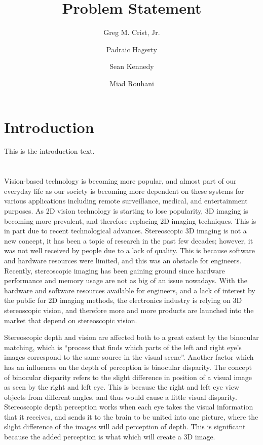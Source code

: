 \documentclass{article}
\title{Problem Statement}
\author{
    Greg M. Crist, Jr.
    \and
    Padraic Hagerty
    \and
    Sean Kennedy
    \and
    Miad Rouhani
}
\begin{document}
\maketitle

\section{Introduction}
This is the introduction text. \cite{segal}

\section{}

Vision-based technology is becoming more popular, and almost part of our everyday life as our society is becoming more dependent on these systems for various applications including remote surveillance, medical, and entertainment purposes. As 2D vision technology is starting to lose popularity, 3D imaging is becoming more prevalent, and therefore replacing 2D imaging techniques. This is in part due to recent technological advances. Stereoscopic 3D imaging is not a new concept, it has been a topic of research in the past few decades; however, it was not well received by people due to a lack of quality. This is because software and hardware resources were limited, and this was an obstacle for engineers. Recently, stereoscopic imaging has been gaining ground since hardware performance and memory usage are not as big of an issue nowadays. With the hardware and software resources available for engineers, and a lack of interest by the public for 2D imaging methods, the electronics industry is relying on 3D stereoscopic vision, and therefore more and more products are launched into the market that depend on stereoscopic vision.

Stereoscopic depth and vision are affected both to a great extent by the binocular matching, which is “process that finds which parts of the left and right eye’s images correspond to the same source in the visual scene”. Another factor which has an influences on the depth of perception is binocular disparity.  The concept of binocular disparity refers to the slight difference in position of a visual image as seen by the right and left eye. This is because the right and left eye view objects from different angles, and thus would cause a little visual disparity. Stereoscopic depth perception works when each eye takes the visual information that it receives, and sends it to the brain to be united into one picture, where the slight difference of the images will add perception of depth. This is significant because the added perception is what which will create a 3D image.


\printbibliography
\end{document}
